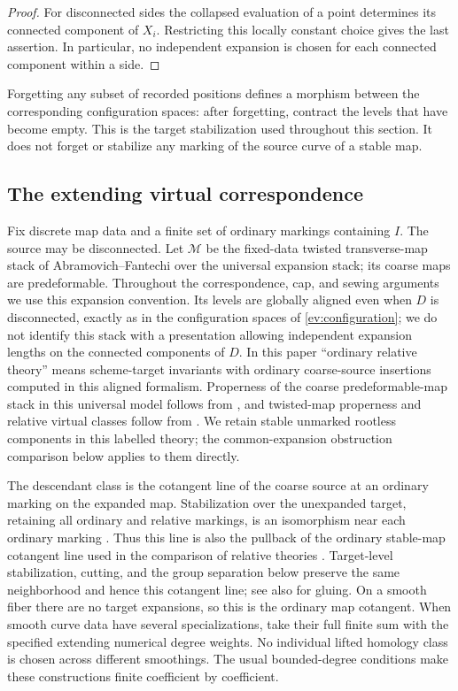 \begin{proof}
For disconnected sides the collapsed evaluation of a point determines
its connected component of $X_i$.  Restricting this locally constant
choice gives the last assertion.  In particular, no independent
expansion is chosen for each connected component within a side.
\end{proof}

Forgetting any subset of recorded positions defines a morphism between
the corresponding configuration spaces: after forgetting, contract
the levels that have become empty.  This is the target stabilization
used throughout this section.  It does not forget or stabilize any
marking of the source curve of a stable map.

\subsection{The extending virtual correspondence}

Fix discrete map data and a finite set of ordinary markings containing
$I$.  The source may be disconnected.  Let $\mathcal M$ be the
fixed-data twisted transverse-map stack of Abramovich--Fantechi over
the universal expansion stack; its coarse maps are predeformable.
Throughout the correspondence, cap, and sewing arguments we use this
expansion convention.  Its levels
are globally aligned even when $D$ is disconnected, exactly as in
the configuration spaces of \cref{ev:configuration}; we do not
identify this stack with a presentation allowing independent
expansion lengths on the connected components of $D$.  In this paper
``ordinary relative theory'' means scheme-target invariants with
ordinary coarse-source insertions computed in this aligned formalism.
Properness of the coarse predeformable-map stack in this universal
model follows from \cite[Corollary~2.2.9]{AFConfigurations}, and
twisted-map properness and relative virtual classes follow from
\cite[Theorem~3.26 and Section~4.7]{AF2016}.  We retain stable
unmarked rootless components in this labelled theory; the
common-expansion obstruction comparison below applies to them
directly.

The descendant class is the cotangent line of the coarse source at
an ordinary marking on the expanded map.  Stabilization over the
unexpanded target, retaining all ordinary and relative markings, is
an isomorphism near each ordinary marking
\cite[Definition~4.1 and Section~4.3]{AF2016}.  Thus this line is
also the pullback of the ordinary stable-map cotangent line used
in the comparison of relative theories
\cite[Corollary~1.1.3 and Section~2.3]{AMWComparison}.
Target-level stabilization, cutting, and the group separation below
preserve the same neighborhood and hence this cotangent line;
see also \cite[Section~5.10]{AF2016} for gluing.  On a smooth fiber
there are no target expansions, so this is the ordinary map
cotangent.  When smooth
curve data have several specializations, take their full finite sum
with the specified extending numerical degree weights.  No individual
lifted homology class is chosen across different smoothings.  The
usual bounded-degree conditions make these constructions finite
coefficient by coefficient.

